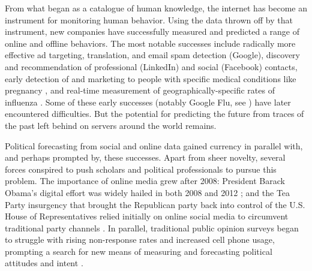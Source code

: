 \documentclass{article}
\begin{document}

From what began as a catalogue of human knowledge, the internet has
become an instrument for monitoring human behavior. Using the data
thrown off by that instrument, new companies have successfully
measured and predicted a range of online and offline behaviors. The
most notable successes include radically more effective ad targeting,
translation, 
and email spam detection
(Google), discovery and recommendation of professional (LinkedIn) and
social (Facebook) contacts, early detection of and marketing to people
with specific medical conditions like pregnancy \citep{hill2012},
and real-time measurement of geographically-specific rates of influenza
\citep{ginsberg2008detecting}. Some of these early successes (notably Google
Flu, see \cite{butler2013google,41763}) have later encountered
difficulties. But the potential for predicting the future from 
traces of the past left behind on servers around the world remains.

Political forecasting from social and online data gained currency in
parallel with, and perhaps prompted by, these successes. Apart from
sheer novelty, several forces conspired to push scholars and political
professionals to pursue this problem. The importance of online media grew after
2008: President Barack Obama's digital effort was widely hailed in
both 2008 and 2012
\citep{smith2009internet,wallsten2010yes,levenshus2010online,scherer2012}; and the
Tea Party insurgency that brought the Republican party back into
control of the U.S. House of Representatives relied initially on
online social media to circumvent traditional party channels
\citep{williamson2011tea}. In parallel, traditional public opinion
surveys began to struggle with rising non-response rates and increased
cell phone usage, prompting a search for new means of measuring and
forecasting political attitudes and intent
\citep{keeter2006gauging,kohut2012assessing,christian2010assessing,boyle2013sampling,viera2013mail}.
\end{document}
